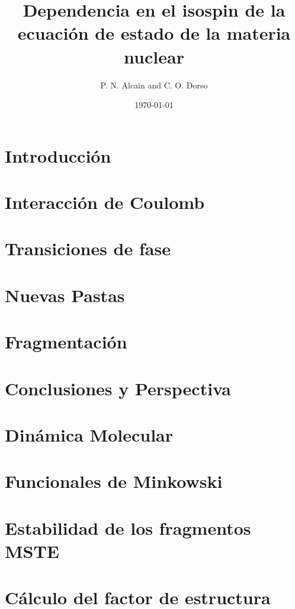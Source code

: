 \documentclass[12pt]{book}
\title{Dependencia en el isospin de la ecuación de estado de la materia nuclear}
\author{P. N. Alcain and C. O. Dorso}
\date{\today}
\begin{document}
\maketitle
{}
\tableofcontents

\chapter[Introducción]{Introducción}
\label{ch:introduccion}



\chapter[Efecto de Coulomb]{Interacción de Coulomb}
\label{ch:coulomb}


\chapter[Transiciones de fase]{Transiciones de fase}
\label{ch:transicion}


\chapter[Nuevas pastas]{Nuevas Pastas}
\label{ch:nuevas_pastas}


\chapter[Fragmentación]{Fragmentación}
\label{ch:fragmentacion}


\chapter[Conclusiones y Perspectiva]{Conclusiones y Perspectiva}
\label{ch:conclusiones}


\appendix

\chapter{Dinámica Molecular}
\label{ap:md}


\chapter{Funcionales de Minkowski}
\label{ap:minkowski}


\chapter{Estabilidad de los fragmentos MSTE}
\label{ap:mste}


\chapter{Cálculo del factor de estructura}
\label{ap:sq}



\end{document}
